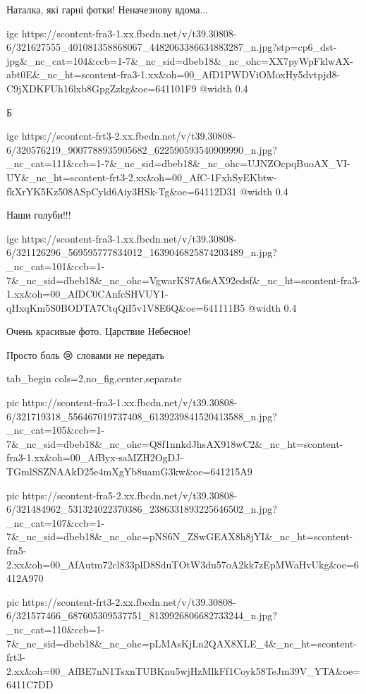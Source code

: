 
Наталка, які гарні фотки! Неначезнову вдома...


\ifcmt
  igc https://scontent-fra3-1.xx.fbcdn.net/v/t39.30808-6/321627555_401081358868067_4482063386634883287_n.jpg?stp=cp6_dst-jpg&_nc_cat=104&ccb=1-7&_nc_sid=dbeb18&_nc_ohc=XX7pyWpFklwAX-abt0E&_nc_ht=scontent-fra3-1.xx&oh=00_AfD1PWDViOMoxHy5dvtpjd8-C9jXDKFUh16lxb8GpgZzkg&oe=641101F9
  @width 0.4
\fi


Б

\ifcmt
  igc https://scontent-frt3-2.xx.fbcdn.net/v/t39.30808-6/320576219_9007788935905682_622590593540909990_n.jpg?_nc_cat=111&ccb=1-7&_nc_sid=dbeb18&_nc_ohc=UJNZOcpqBuoAX_VI-UY&_nc_ht=scontent-frt3-2.xx&oh=00_AfC-1FxhSyEKbtw-fkXrYK5Kz508ASpCyld6Aiy3HSk-Tg&oe=64112D31
  @width 0.4
\fi


Наши голуби!!!

\ifcmt
  igc https://scontent-fra3-1.xx.fbcdn.net/v/t39.30808-6/321126296_569595777834012_1639046825874203489_n.jpg?_nc_cat=101&ccb=1-7&_nc_sid=dbeb18&_nc_ohc=VgwarKS7A6sAX92edsf&_nc_ht=scontent-fra3-1.xx&oh=00_AfDC0CAnfcSHVUY1-qHxqKm5S0BODTA7CtqQiI5v1V8E6Q&oe=641111B5
  @width 0.4
\fi


Очень красивые фото. Царствие Небесное!


Просто боль 😢 словами не передать


\ifcmt
  tab_begin cols=2,no_fig,center,separate

     pic https://scontent-fra3-1.xx.fbcdn.net/v/t39.30808-6/321719318_556467019737408_6139239841520413588_n.jpg?_nc_cat=105&ccb=1-7&_nc_sid=dbeb18&_nc_ohc=Q8f1nnkdJhsAX918wC2&_nc_ht=scontent-fra3-1.xx&oh=00_AfByx-saMZH2OgDJ-TGmlSSZNAAkD25e4mXgYb8uamG3kw&oe=641215A9

     pic https://scontent-fra5-2.xx.fbcdn.net/v/t39.30808-6/321484962_531324022370386_2386331893225646502_n.jpg?_nc_cat=107&ccb=1-7&_nc_sid=dbeb18&_nc_ohc=pNS6N_ZSwGEAX8h8jYI&_nc_ht=scontent-fra5-2.xx&oh=00_AfAutm72cl833plD8SduTOtW3du57oA2kk7zEpMWaHvUkg&oe=6412A970

     pic https://scontent-frt3-2.xx.fbcdn.net/v/t39.30808-6/321577466_687605309537751_8139926806682733244_n.jpg?_nc_cat=110&ccb=1-7&_nc_sid=dbeb18&_nc_ohc=pLMAsKjLn2QAX8XLE_4&_nc_ht=scontent-frt3-2.xx&oh=00_AfBE7nN1TsxnTUBKnu5wjHzMlkFf1Coyk58TeJm39V_YTA&oe=6411C7DD

